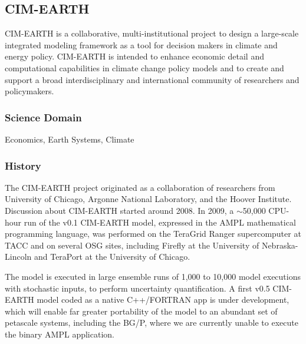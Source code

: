 \documentclass[10pt,letterpaper]{article}
\begin{document}
\subsection{CIM-EARTH}


CIM-EARTH is a collaborative, multi-institutional project to design a large-scale integrated modeling framework as a tool for decision makers in climate and energy policy. CIM-EARTH is intended to enhance economic detail and computational capabilities in climate change policy models and to create and support a broad interdisciplinary and international community of researchers and policymakers.

\subsubsection{Science Domain} Economics, Earth Systems, Climate

\subsubsection{History}
The CIM-EARTH project originated as a collaboration of researchers from University of Chicago, Argonne National Laboratory, and the Hoover Institute. Discussion about CIM-EARTH started around 2008. In 2009, a $\sim$50,000 CPU-hour run of the v0.1 CIM-EARTH model, expressed in the AMPL mathematical programming language, was performed on the TeraGrid Ranger supercomputer at TACC and on several OSG sites, including Firefly at the University of Nebraska-Lincoln and TeraPort at the University of Chicago.

The model is executed in large ensemble runs of 1,000 to 10,000 model executions with stochastic inputs, to perform uncertainty quantification.
A first v0.5 CIM-EARTH model coded as a native C++/FORTRAN app is under development, which will enable far greater portability of the model to an abundant set of petascale systems, including the BG/P, where we are currently unable to execute the binary AMPL application. 
\end{document}
